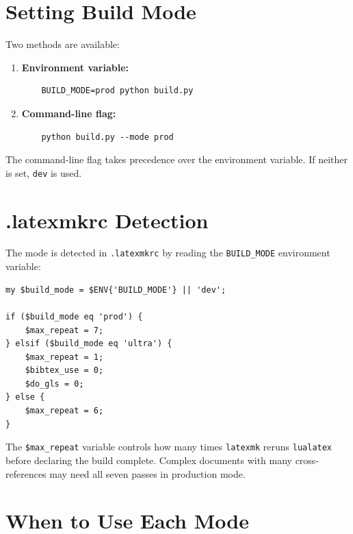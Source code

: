 \section{Setting Build Mode}

Two methods are available:

\begin{enumerate}
  \item \textbf{Environment variable:}
    \begin{verbatim}
    BUILD_MODE=prod python build.py
    \end{verbatim}

  \item \textbf{Command-line flag:}
    \begin{verbatim}
    python build.py --mode prod
    \end{verbatim}
\end{enumerate}

The command-line flag takes precedence over the environment variable.
If neither is set, \texttt{dev} is used.

\section{.latexmkrc Detection}

The mode is detected in \texttt{.latexmkrc} by reading the
\texttt{BUILD\_MODE} environment variable:

\begin{verbatim}
my $build_mode = $ENV{'BUILD_MODE'} || 'dev';

if ($build_mode eq 'prod') {
    $max_repeat = 7;
} elsif ($build_mode eq 'ultra') {
    $max_repeat = 1;
    $bibtex_use = 0;
    $do_gls = 0;
} else {
    $max_repeat = 6;
}
\end{verbatim}

The \texttt{\$max\_repeat} variable controls how many times
\texttt{latexmk} reruns \texttt{lualatex} before declaring the build
complete.  Complex documents with many cross-references may need all
seven passes in production mode.

\section{When to Use Each Mode}

